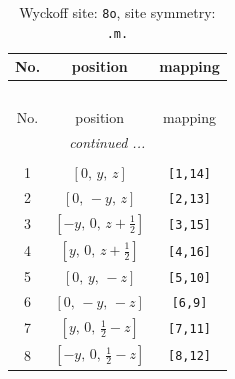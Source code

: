 \documentclass[fleqn,8pt]{jsarticle}
\begin{document}
\renewcommand{\arraystretch}{1.2}
\begin{longtable}{ccc}
\caption{Wyckoff site: {\tt 8o}, site symmetry: {\tt .m.}}
 \\
 \hline \hline
No. & position & mapping \\ \hline \endfirsthead

\multicolumn{2}{l}{\tablename\ \thetable{}} \\
 \hline \hline
No. & position & mapping \\ \hline \endhead

 \hline \hline
\multicolumn{2}{r}{\footnotesize\it continued ...} \\ \endfoot

 \hline \hline
\multicolumn{2}{r}{} \\ \endlastfoot

1 & $\left[ 0,\, y,\, z \right]$ & {\tt [1,14]} \\ \hline
2 & $\left[ 0,\, - y,\, z \right]$ & {\tt [2,13]} \\ \hline
3 & $\left[ - y,\, 0,\, z + \frac{1}{2} \right]$ & {\tt [3,15]} \\ \hline
4 & $\left[ y,\, 0,\, z + \frac{1}{2} \right]$ & {\tt [4,16]} \\ \hline
5 & $\left[ 0,\, y,\, - z \right]$ & {\tt [5,10]} \\ \hline
6 & $\left[ 0,\, - y,\, - z \right]$ & {\tt [6,9]} \\ \hline
7 & $\left[ y,\, 0,\, \frac{1}{2} - z \right]$ & {\tt [7,11]} \\ \hline
8 & $\left[ - y,\, 0,\, \frac{1}{2} - z \right]$ & {\tt [8,12]} \\
\end{longtable}
\renewcommand{\arraystretch}{1.2}
\end{document}
